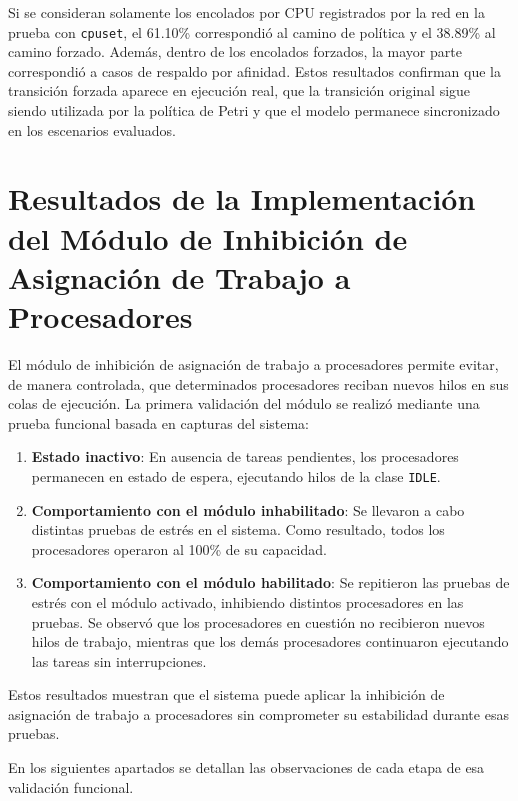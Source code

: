 Si se consideran solamente los encolados por CPU registrados por la red en la prueba con \verb|cpuset|, el 61.10\% correspondió al camino de política y el 38.89\% al camino forzado. Además, dentro de los encolados forzados, la mayor parte correspondió a casos de respaldo por afinidad. Estos resultados confirman que la transición forzada aparece en ejecución real, que la transición original sigue siendo utilizada por la política de Petri y que el modelo permanece sincronizado en los escenarios evaluados.\par

\section{Resultados de la Implementación del Módulo de Inhibición de Asignación de Trabajo a Procesadores}

El módulo de inhibición de asignación de trabajo a procesadores permite evitar, de manera controlada, que determinados procesadores reciban nuevos hilos en sus colas de ejecución. La primera validación del módulo se realizó mediante una prueba funcional basada en capturas del sistema:

\begin{enumerate}
    \item \textbf{Estado inactivo}: En ausencia de tareas pendientes, los procesadores permanecen en estado de espera, ejecutando hilos de la clase \texttt{IDLE}.\@
    \item \textbf{Comportamiento con el módulo inhabilitado}: Se llevaron a cabo distintas pruebas de estrés en el sistema. Como resultado, todos los procesadores operaron al 100\% de su capacidad.
    \item \textbf{Comportamiento con el módulo habilitado}: Se repitieron las pruebas de estrés con el módulo activado, inhibiendo distintos procesadores en las pruebas. Se observó que los procesadores en cuestión no recibieron nuevos hilos de trabajo, mientras que los demás procesadores continuaron ejecutando las tareas sin interrupciones.
\end{enumerate}

Estos resultados muestran que el sistema puede aplicar la inhibición de asignación de trabajo a procesadores sin comprometer su estabilidad durante esas pruebas.\par

En los siguientes apartados se detallan las observaciones de cada etapa de esa validación funcional.\par

